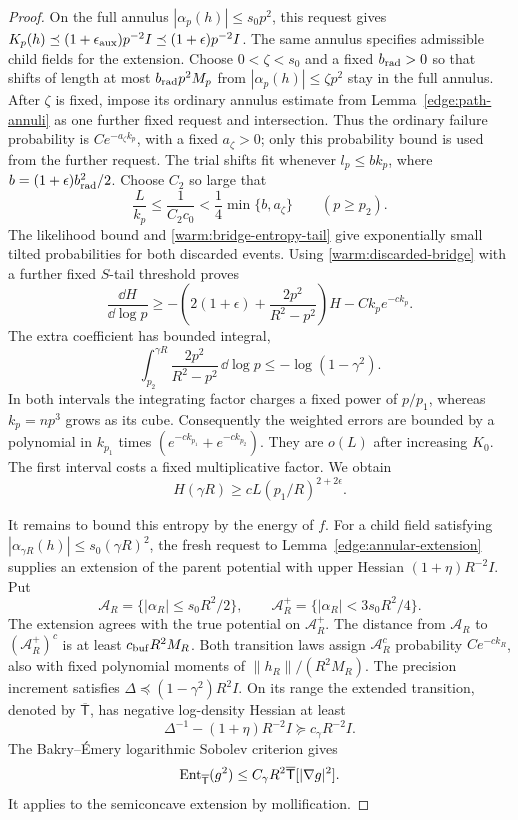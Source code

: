 \begin{proof}
On the full annulus \(|\alpha_p(h)|\le s_0p^2\), this request gives
\(K_p(h)\preceq(1+\epsilon_{\rm aux})p^{-2}I
\preceq(1+\epsilon)p^{-2}I\).  The same annulus specifies admissible
child fields for the extension.  Choose \(0<\zeta<s_0\) and a fixed
\(b_{\rm rad}>0\) so that shifts of length at most
\(b_{\rm rad}p^2M_p\) from \(|\alpha_p(h)|\le\zeta p^2\) stay in the
full annulus.  After \(\zeta\) is fixed, impose its ordinary annulus
estimate from Lemma~\ref{edge:path-annuli} as one further fixed request
and intersection.  Thus the ordinary failure probability is
\(Ce^{-a_\zeta k_p}\), with a fixed \(a_\zeta>0\); only this probability
bound is used from the further request.  The trial shifts fit whenever
\(l_p\le b k_p\), where \(b=(1+\epsilon)b_{\rm rad}^2/2\).
Choose \(C_2\) so large that
\[
 \frac{L}{k_p}\le\frac1{C_2c_0}
       <\frac14\min\{b,a_\zeta\}\qquad(p\ge p_2).
\]
The likelihood bound and \eqref{warm:bridge-entropy-tail} give
exponentially small tilted probabilities for both discarded events.
Using \eqref{warm:discarded-bridge} with a further fixed \(S\)-tail
threshold proves
\[
 \frac{\dd H}{\dd\log p}
 \ge-\left(2(1+\epsilon)+\frac{2p^2}{R^2-p^2}\right)H
        -Ck_pe^{-c k_p}.
\]
The extra coefficient has bounded integral,
\[
 \int_{p_2}^{\gamma R}\frac{2p^2}{R^2-p^2}\,\dd\log p
       \le-\log(1-\gamma^2).
\]
In both intervals the integrating factor charges a fixed power of
\(p/p_1\), whereas \(k_p=np^3\) grows as its cube.  Consequently the
weighted errors are bounded by a polynomial in \(k_{p_1}\) times
\((e^{-c k_{p_1}}+e^{-c k_{p_2}})\).  They are \(o(L)\) after
increasing \(K_0\).  The first interval costs a fixed multiplicative
factor.  We obtain
\begin{equation}
 H(\gamma R)\ge cL(p_1/R)^{2+2\epsilon}.                  \label{warm:retained-small}
\end{equation}

It remains to bound this entropy by the energy of \(f\).  For a child
field satisfying \(|\alpha_{\gamma R}(h)|\le s_0(\gamma R)^2\), the
fresh request to Lemma~\ref{edge:annular-extension} supplies an extension
of the parent potential with upper Hessian \((1+\eta)R^{-2}I\).  Put
\[
 \mathcal A_R=\{|\alpha_R|\le s_0R^2/2\},\qquad
 \mathcal A_R^+=\{|\alpha_R|<3s_0R^2/4\}.
\]
The extension agrees with the true potential on \(\mathcal A_R^+\).
The distance from \(\mathcal A_R\) to \((\mathcal A_R^+)^c\) is at least
\(c_{\rm buf}R^2M_R\).  Both transition laws assign
\(\mathcal A_R^c\) probability \(Ce^{-c k_R}\), also with fixed
polynomial moments of \(\|h_R\|/(R^2M_R)\).
The precision increment satisfies
\(\Delta\preceq(1-\gamma^2)R^2I\).  On its range the extended
transition, denoted by \(\overline{\mathsf T}\), has negative log-density Hessian at least
\[
 \Delta^{-1}-(1+\eta)R^{-2}I\succeq c_\gamma R^{-2}I .
\]
The Bakry--\'Emery logarithmic Sobolev criterion
\cite[Corollary~5.7.2]{BakryGentilLedoux2014} gives
\[
\operatorname{Ent}_{\overline{\mathsf T}}(g^2)
\le C_\gamma R^2\overline{\mathsf T}[|\nabla g|^2].
\]
It applies to the semiconcave extension by mollification.


\end{proof}
